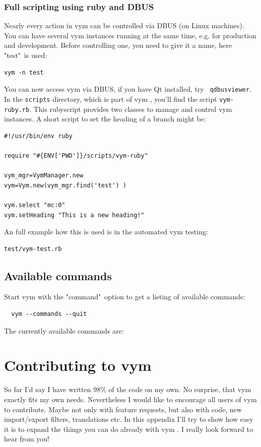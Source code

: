 \documentclass[12pt,a4paper]{article}
\newcommand{\vym}{{\sc vym }}
\begin{document}
\begin{appendix}
\subsubsection{Full scripting using ruby and DBUS} \label{dbus}
Nearly every action in \vym can be controlled via DBUS (on Linux
machines). You can have several \vym instances running at the same time,
e.g. for production and development. Before controlling one, you need to
give it a name, here "test"\ is used:
\begin{verbatim}
vym -n test
\end{verbatim}
You can now access \vym via DBUS, if you have Qt installed, try {\tt
qdbusviewer}. In the {\tt scripts} directory, which is part of \vym,
you'll find the script {\tt vym-ruby.rb}. This rubyscript provides two
classes to manage and control \vym instances. A short script to set the
heading of a branch might be:
\begin{verbatim}
#!/usr/bin/env ruby

require "#{ENV['PWD']}/scripts/vym-ruby"

vym_mgr=VymManager.new
vym=Vym.new(vym_mgr.find('test') )

vym.select "mc:0"
vym.setHeading "This is a new heading!"
\end{verbatim}

An full example how this is
used is in the automated \vym testing:
\begin{verbatim}
test/vym-test.rb
\end{verbatim}

\subsection{Available commands}
Start vym with the "command"\ option to get a listing of available
commands:
\begin{verbatim}
  vym --commands --quit
\end{verbatim}
The currently available commands are:
\begin{itemize}
    
\end{itemize}



\section{Contributing to \vym}
So far I'd say I have written 98\% of the code on my own. No surprise,
that \vym exactly fits my own needs. Nevertheless I would like to
encourage all users of  \vym to contribute. Maybe not only with feature
requests, but also with code, new import/export filters, translations
etc. In this appendix I'll try to show how easy it is to expand the
things you can do already with \vym. I really look forward to hear from
you!


\end{appendix}
\end{document}
